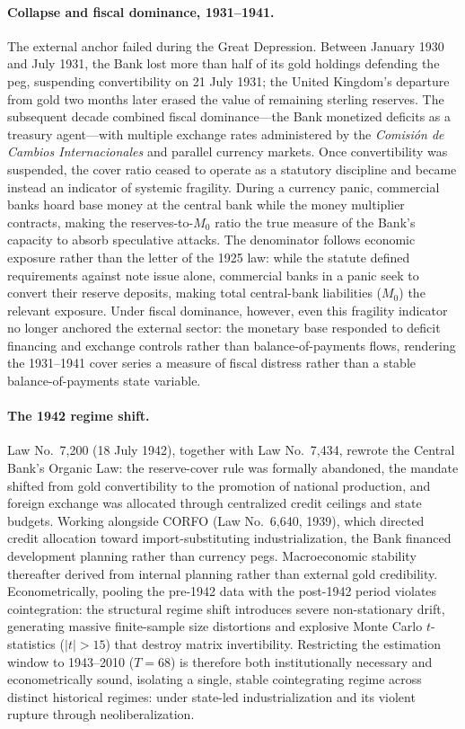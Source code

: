 \paragraph{Collapse and fiscal dominance, 1931--1941.}
The external anchor failed during the Great Depression. Between January 1930 and July 1931, the Bank lost more than half of its gold holdings defending the peg, suspending convertibility on 21 July 1931; the United Kingdom's departure from gold two months later erased the value of remaining sterling reserves. The subsequent decade combined fiscal dominance---the Bank monetized deficits as a treasury agent---with multiple exchange rates administered by the \textit{Comisión de Cambios Internacionales} and parallel currency markets. Once convertibility was suspended, the cover ratio ceased to operate as a statutory discipline and became instead an indicator of systemic fragility. During a currency panic, commercial banks hoard base money at the central bank while the money multiplier contracts, making the reserves-to-$M_0$ ratio the true measure of the Bank's capacity to absorb speculative attacks. The denominator follows economic exposure rather than the letter of the 1925 law: while the statute defined requirements against note issue alone, commercial banks in a panic seek to convert their reserve deposits, making total central-bank liabilities ($M_0$) the relevant exposure. Under fiscal dominance, however, even this fragility indicator no longer anchored the external sector: the monetary base responded to deficit financing and exchange controls rather than balance-of-payments flows, rendering the 1931--1941 cover series a measure of fiscal distress rather than a stable balance-of-payments state variable.

\paragraph{The 1942 regime shift.}
Law No.~7,200 (18 July 1942), together with Law No.~7,434, rewrote the Central Bank's Organic Law: the reserve-cover rule was formally abandoned, the mandate shifted from gold convertibility to the promotion of national production, and foreign exchange was allocated through centralized credit ceilings and state budgets. Working alongside CORFO (Law No.~6,640, 1939), which directed credit allocation toward import-substituting industrialization, the Bank financed development planning rather than currency pegs. Macroeconomic stability thereafter derived from internal planning rather than external gold credibility. Econometrically, pooling the pre-1942 data with the post-1942 period violates cointegration: the structural regime shift introduces severe non-stationary drift, generating massive finite-sample size distortions and explosive Monte Carlo $t$-statistics ($|t| > 15$) that destroy matrix invertibility. Restricting the estimation window to 1943--2010 ($T = 68$) is therefore both institutionally necessary and econometrically sound, isolating a single, stable cointegrating regime across distinct historical regimes: under state-led industrialization and its violent rupture through neoliberalization. 

